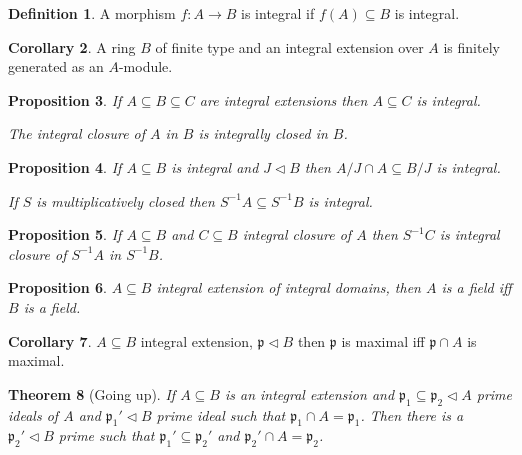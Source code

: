 \documentclass{article}
\newcommand{\primeid}{\mathfrak{p}}
\newcommand{\ideal}{\triangleleft}
\newtheorem{theorem}{Theorem}[section]
\newtheorem{proposition}[theorem]{Proposition}
\theoremstyle{definition}
\newtheorem{definition}[theorem]{Definition}
\newtheorem{corollary}[theorem]{Corollary}
\begin{document}
\begin{definition}
    A morphism \(f:A\to B\) is integral if \(f(A)\subseteq B\) is integral.
\end{definition}

\begin{corollary}
    A ring \(B\) of finite type and an integral extension over \(A\) is finitely
    generated as an \(A\)-module.
\end{corollary}

\begin{proposition}
    If \(A\subseteq B\subseteq C\) are integral extensions then
    \(A\subseteq C\) is integral.

    The integral closure of \(A\) in \(B\) is integrally closed in \(B\).
\end{proposition}

\begin{proposition}
    If \(A\subseteq B\) is integral and \(J\ideal B\) then
    \(A/J\cap A\subseteq B/J\) is integral.

    If \(S\) is multiplicatively closed then
    \(S^{-1}A\subseteq S^{-1}B\) is integral.
\end{proposition}

\begin{proposition}
    If \(A\subseteq B\) and \(C\subseteq B\) integral closure of \(A\)
    then \(S^{-1}C\) is integral closure of \(S^{-1}A\) in \(S^{-1}B\).
\end{proposition}

\begin{proposition}
    \(A\subseteq B\) integral extension of integral domains, then \(A\) is a
    field iff \(B\) is a field.
\end{proposition}

\begin{corollary}
    \(A\subseteq B\) integral extension, \(\primeid\ideal B\) then \(\primeid\)
    is maximal iff \(\primeid\cap A\) is maximal.
\end{corollary}

\begin{theorem}[Going up]
    If \(A\subseteq B\) is an integral extension and
    \(\primeid_{1}\subseteq\primeid_{2}\ideal A\) prime ideals of \(A\) and
    \(\primeid_{1}'\ideal B\) prime ideal such that \(\primeid_{1}\cap
    A=\primeid_{1}\). Then there is a \(\primeid_{2}'\ideal B\) prime such that
    \(\primeid_{1}'\subseteq\primeid_{2}'\) and \(\primeid_{2}'\cap
    A=\primeid_{2}\).
\end{theorem}
\end{document}
